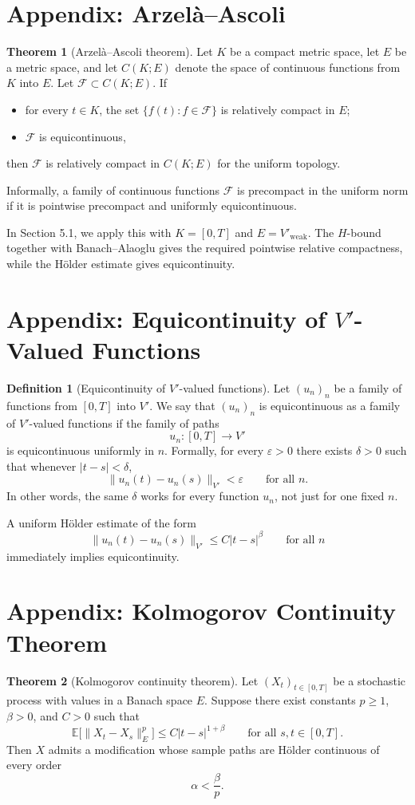 \documentclass[11pt]{article}
\theoremstyle{definition}
\newtheorem{definition}{Definition}
\newtheorem{theorem}{Theorem}
\theoremstyle{remark}
\begin{document}
\section*{Appendix: Arzel\`a--Ascoli}
\begin{theorem}[Arzel\`a--Ascoli theorem]
Let $K$ be a compact metric space, let $E$ be a metric space, and let $C(K;E)$ denote the space of continuous functions from $K$ into $E$. Let $\mathcal F\subset C(K;E)$. If
\begin{itemize}
\item for every $t\in K$, the set $\{f(t):f\in \mathcal F\}$ is relatively compact in $E$;
\item $\mathcal F$ is equicontinuous,
\end{itemize}
then $\mathcal F$ is relatively compact in $C(K;E)$ for the uniform topology.
\end{theorem}

Informally, a family of continuous functions $\mathcal F$ is precompact in the uniform norm if it is pointwise precompact and uniformly equicontinuous.

In Section 5.1, we apply this with $K=[0,T]$ and $E=V'_{\mathrm{weak}}$. The $H$-bound together with Banach--Alaoglu gives the required pointwise relative compactness, while the H\"older estimate gives equicontinuity.

\section*{Appendix: Equicontinuity of $V'$-Valued Functions}
\begin{definition}[Equicontinuity of $V'$-valued functions]
Let $(u_n)_n$ be a family of functions from $[0,T]$ into $V'$. We say that $(u_n)_n$ is equicontinuous as a family of $V'$-valued functions if the family of paths
\[
  u_n:[0,T]\to V'
\]
is equicontinuous uniformly in $n$. Formally, for every $\varepsilon>0$ there exists $\delta>0$ such that whenever $|t-s|<\delta$,
\[
  \|u_n(t)-u_n(s)\|_{V'}<\varepsilon
  \qquad \text{for all } n.
\]
In other words, the same $\delta$ works for every function $u_n$, not just for one fixed $n$.
\end{definition}

A uniform H\"older estimate of the form
\[
  \|u_n(t)-u_n(s)\|_{V'}
  \le
  C|t-s|^\beta
  \qquad \text{for all } n
\]
immediately implies equicontinuity.

\section*{Appendix: Kolmogorov Continuity Theorem}
\begin{theorem}[Kolmogorov continuity theorem]
Let $(X_t)_{t\in[0,T]}$ be a stochastic process with values in a Banach space $E$. Suppose there exist constants $p\ge 1$, $\beta>0$, and $C>0$ such that
\[
  \mathbb E\bigl[\|X_t-X_s\|_E^p\bigr]
  \le
  C|t-s|^{1+\beta}
  \qquad \text{for all } s,t\in[0,T].
\]
Then $X$ admits a modification whose sample paths are H\"older continuous of every order
\[
  \alpha<\frac{\beta}{p}.
\]
\end{theorem}
\end{document}
